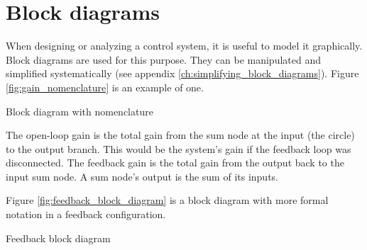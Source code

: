 \section{Block diagrams}

When designing or analyzing a \gls{control system}, it is useful to model it
graphically. Block diagrams are used for this purpose. They can be manipulated
and simplified systematically (see appendix
\ref{ch:simplifying_block_diagrams}). Figure \ref{fig:gain_nomenclature} is an
example of one.

\begin{bookfigure}

  \caption{Block diagram with nomenclature}
  \label{fig:gain_nomenclature}
\end{bookfigure}

The \gls{open-loop gain} is the total gain from the sum node at the input (the
circle) to the output branch. This would be the \gls{system}'s gain if the
feedback loop was disconnected. The \gls{feedback gain} is the total gain from
the output back to the input sum node. A sum node's output is the sum of its
inputs.

Figure \ref{fig:feedback_block_diagram} is a block diagram with more formal
notation in a feedback configuration.

\begin{bookfigure}

  \caption{Feedback block diagram}
  \label{fig:feedback_block_diagram}
\end{bookfigure}
